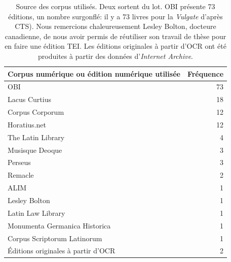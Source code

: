 \begin{table}[h]
    \centering
    \begin{tabular}{lr}
        \toprule
        Corpus numérique ou édition numérique utilisée & Fréquence \\
        \midrule
         OBI\footnotemark            & 73 \\
         Lacus Curtius\footnotemark         & 18 \\
         Corpus Corporum\footnotemark & 12 \\
         Horatius.net\footnotemark    & 12 \\
         The Latin Library\footnotemark   &  4 \\
         Musisque Deoque\footnotemark &  3 \\
         Perseus        &  3 \\
         Remacle\footnotemark        &  2 \\
         ALIM\footnotemark           &  1 \\
         Lesley Bolton\footnotemark         &  1 \\
         Latin Law Library\footnotemark    &  1 \\
         Monumenta Germanica Historica\footnotemark            &  1 \\
         Corpus Scriptorum Latinorum\footnotemark            &  1 \\ \midrule
         Éditions originales à partir d'OCR    &  2 \\
        \bottomrule
    \end{tabular}
    \caption{Source des corpus utilisés. Deux sortent du lot. OBI présente 73 éditions, un nombre surgonflé: il y a 73 livres pour la \textit{Vulgate} d'après CTS). Nous remercions chaleureusement Lesley Bolton, docteure canadienne, de nous avoir permis de réutiliser son travail de thèse pour en faire une édition TEI. Les éditions originales à partir d'OCR ont été produites à partir des données d'\textit{Internet Archive}.}
    \label{tab:chap1:corpusutilises}
\end{table}

